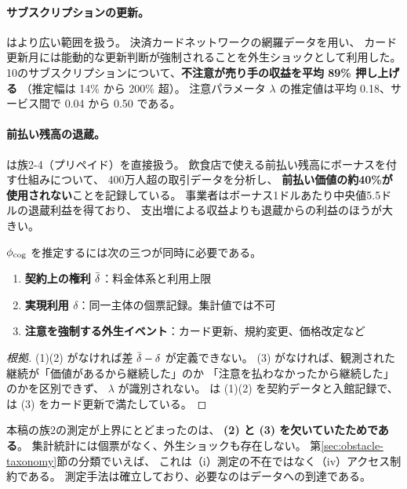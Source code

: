 \paragraph{サブスクリプションの更新。}

\cite{einav2025} はより広い範囲を扱う。
決済カードネットワークの網羅データを用い、
カード更新月には能動的な更新判断が強制されることを外生ショックとして利用した。
10のサブスクリプションについて、\textbf{不注意が売り手の収益を平均 89\% 押し上げる}
（推定幅は 14\% から 200\% 超）。
注意パラメータ $\lambda$ の推定値は平均 0.18、サービス間で 0.04 から 0.50 である。

\paragraph{前払い残高の退蔵。}

\cite{nber2026pnbl} は族2-4（プリペイド）を直接扱う。
飲食店で使える前払い残高にボーナスを付す仕組みについて、
400万人超の取引データを分析し、
\textbf{前払い価値の約40\%が使用されない}ことを記録している。
事業者はボーナス1ドルあたり中央値5.5ドルの退蔵利益を得ており、
支出増による収益よりも退蔵からの利益のほうが大きい。

\begin{proposition}
\label{prop:phicog-requirements}
$\phi_{\rm cog}$ を推定するには次の三つが同時に必要である。
\begin{enumerate}[label=(\arabic*)]
\item \textbf{契約上の権利 $\dbar$}：料金体系と利用上限
\item \textbf{実現利用 $\delta$}：同一主体の個票記録。集計値では不可
\item \textbf{注意を強制する外生イベント}：カード更新、規約変更、価格改定など
\end{enumerate}
\end{proposition}

\begin{proof}[根拠]
(1)(2) がなければ差 $\dbar-\delta$ が定義できない。
(3) がなければ、観測された継続が「価値があるから継続した」のか
「注意を払わなかったから継続した」のかを区別できず、
$\lambda$ が識別されない。
\cite{dellavigna2006} は (1)(2) を契約データと入館記録で、
\cite{einav2025} は (3) をカード更新で満たしている。
\end{proof}

本稿の族2の測定が上界にとどまったのは、
\textbf{(2) と (3) を欠いていたためである}。
集計統計には個票がなく、外生ショックも存在しない。
第\ref{sec:obstacle-taxonomy}節の分類でいえば、
これは（i）測定の不在ではなく（iv）アクセス制約である。
測定手法は確立しており、必要なのはデータへの到達である。

